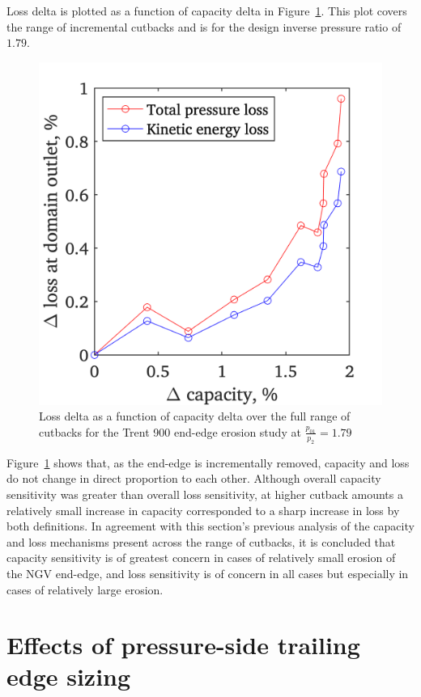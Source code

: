 \documentclass[a4paper, 11pt, oneside]{report}
\begin{document}
Loss delta is plotted as a function of capacity delta in Figure~\ref{fig:ss_capacities_vs_losses}. This plot covers the range of incremental cutbacks and is for the design inverse pressure ratio of $1.79$.

\begin{figure}[H]
	\centering
	\includegraphics[width=.45\textwidth]{figs/ss_capacities_vs_losses.png}
	\caption{Loss delta as a function of capacity delta over the full range of cutbacks for the Trent 900 end-edge erosion study at $\frac{p_{01}}{p_2}=1.79$}
    \label{fig:ss_capacities_vs_losses}
\end{figure}

Figure~\ref{fig:ss_capacities_vs_losses} shows that, as the end-edge is incrementally removed, capacity and loss do not change in direct proportion to each other. Although overall capacity sensitivity was greater than overall loss sensitivity, at higher cutback amounts a relatively small increase in capacity corresponded to a sharp increase in loss by both definitions. In agreement with this section's previous analysis of the capacity and loss mechanisms present across the range of cutbacks, it is concluded that capacity sensitivity is of greatest concern in cases of relatively small erosion of the NGV end-edge, and loss sensitivity is of concern in all cases but especially in cases of relatively large erosion.






\section{Effects of pressure-side trailing edge sizing}
\label{performance_of_an_alternative_trailing_edge_design}
\end{document}
